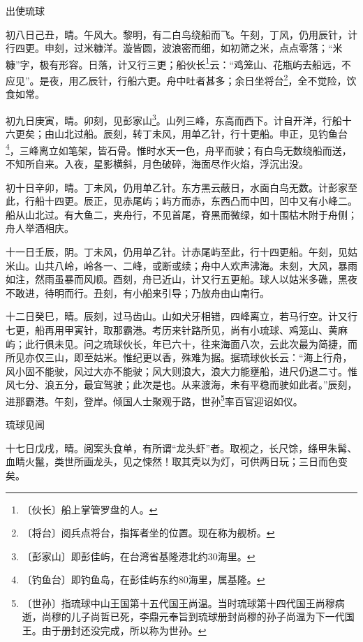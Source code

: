\documentclass[12pt,UTF-8,openany]{ctexbook}
\begin{document}
\begin{normalsize}
    
    出使琉球
    
    初八日己丑，晴。午风大。黎明，有二白鸟绕船而飞。午刻，丁风，仍用辰针，计行四更。申刻，过米糠洋。漩皆圆，波浪密而细，如初筛之米，点点零落；“米糠”字，极有形容。日落，计又行三更；船伙长\footnote{〔伙长〕船上掌管罗盘的人。}云：“鸡笼山、花瓶屿去船远，不应见”。是夜，用乙辰针，行船六更。舟中吐者甚多；余日坐将台\footnote{〔将台〕阅兵点将台，指挥者坐的位置。现在称为舰桥。}，全不觉险，饮食如常。
    
    初九日庚寅，晴。卯刻，见彭家山\footnote{〔彭家山〕即彭佳屿，在台湾省基隆港北约30海里。}。山列三峰，东高而西下。计自开洋，行船十六更矣；由山北过船。辰刻，转丁未风，用单乙针，行十更船。申正，见钓鱼台\footnote{〔钓鱼台〕即钓鱼岛，在彭佳屿东约80海里，属基隆。}，三峰离立如笔架，皆石骨。惟时水天一色，舟平而驶；有白鸟无数绕船而送，不知所自来。入夜，星影横斜，月色破碎，海面尽作火焰，浮沉出没。
    
    初十日辛卯，晴。丁未风，仍用单乙针。东方黑云蔽日，水面白鸟无数。计彭家至此，行船十四更。辰正，见赤尾屿；屿方而赤，东西凸而中凹，凹中又有小峰二。船从山北过。有大鱼二，夹舟行，不见首尾，脊黑而微绿，如十围枯木附于舟侧；舟人举酒相庆。
    
    十一日壬辰，阴。丁未风，仍用单乙针。计赤尾屿至此，行十四更船。午刻，见姑米山。山共八岭，岭各一、二峰，或断或续；舟中人欢声沸海。未刻，大风，暴雨如注，然雨虽暴而风顺。酉刻，舟已近山，计又行五更船。球人以姑米多礁，黑夜不敢进，待明而行。丑刻，有小船来引导；乃放舟由山南行。
    
    十二日癸巳，晴。辰刻，过马齿山。山如犬牙相错，四峰离立，若马行空。计又行七更，船再用甲寅针，取那霸港。考历来针路所见，尚有小琉球、鸡笼山、黄麻屿；此行俱未见。问之琉球伙长，年已六十，往来海面八次，云此次最为简捷，而所见亦仅三山，即至姑米。惟纪更以香，殊难为据。据琉球伙长云：“海上行舟，风小固不能驶，风过大亦不能驶；风大则浪大，浪大力能壅船，进尺仍退二寸。惟风七分、浪五分，最宜驾驶；此次是也。从来渡海，未有平稳而驶如此者。”辰刻，进那霸港。午刻，登岸。倾国人士聚观于路，世孙\footnote{〔世孙〕指琉球中山王国第十五代国王尚温。当时琉球第十四代国王尚穆病逝，尚穆的儿子尚哲已死，李鼎元奉旨到琉球册封尚穆的孙子尚温为下一代国王。由于册封还没完成，所以称为世孙。}率百官迎诏如仪。
    
    琉球见闻
    
    十七日戊戌，晴。阅案头食单，有所谓“龙头虾”者。取视之，长尺馀，绦甲朱髯、血睛火鬣，类世所画龙头，见之悚然！取其壳以为灯，可供两日玩；三日而色变矣。
    

\end{normalsize}
\end{document}
